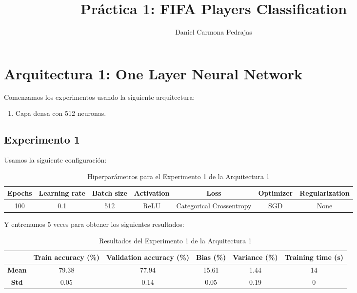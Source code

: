 \documentclass{article}
\begin{document}
\title{Pr\'actica 1: FIFA Players Classification}

\author{{Daniel Carmona Pedrajas}}

\date{}
\maketitle



	\section{Arquitectura 1: One Layer Neural Network}
		Comenzamos los experimentos usando la siguiente arquitectura:
		\begin{enumerate}
			\item Capa densa con 512 neuronas.
		\end{enumerate}
		\subsection{Experimento 1}
		\label{s-a1-e1}
			Usamos la siguiente configuraci\'on:
			\begin{table}[h]
				\begin{center}
					\begin{tabular}{| c | c | c | c | c | c | c |}
						\textbf{Epochs} & \textbf{Learning rate} & \textbf{Batch size} & \textbf{Activation} & \textbf{Loss} & \textbf{Optimizer} & \textbf{Regularization} \\ \hline
						100 & 0.1 & 512 & ReLU & Categorical Crossentropy & SGD & None
					\end{tabular}
					\caption{Hiperpar\'ametros para el Experimento 1 de la Arquitectura 1}
					\label{tab:hip-a1-e1}
				\end{center}
			\end{table}
		
			Y entrenamos 5 veces para obtener los siguientes resultados:
			\begin{table}[h]
				\begin{center}
					\begin{tabular}{ c | c | c | c | c | c |}
						\ & \textbf{Train accuracy (\%)} & \textbf{Validation accuracy (\%)} & \textbf{Bias (\%)} & \textbf{Variance (\%)} & \textbf{Training time (s)} \\ \hline
						\textbf{Mean} & 79.38 & 77.94 & 15.61 & 1.44 & 14\\ \hline
						\textbf{Std} & 0.05 & 0.14 & 0.05 & 0.19 & 0 \\ \hline
					\end{tabular}
					\caption{Resultados del Experimento 1 de la Arquitectura 1}
					\label{tab:res-a1-e1}
				\end{center}
			\end{table}
		
\end{document}

